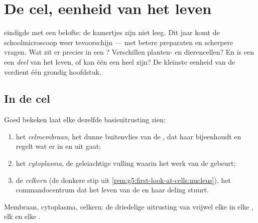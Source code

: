 \chapter{De cel, eenheid van het leven}\label{ch:g6:cell-unit-of-life}

 eindigde met een belofte: de kamertjes
zijn niet leeg. Dit jaar komt de schoolmicroscoop weer tevoorschijn ---
met betere preparaten en scherpere vragen. Wat zit er precies in een ?
Verschillen planten- en dierencellen? En is een  een \emph{deel} van
het leven, of kan één  een heel  zijn? De kleinste eenheid
van de  verdient één grondig hoofdstuk.

\section{In de cel}

\begin{definition}\label{def:g6:cell-unit-of-life:parts}
Goed bekeken laat elke  dezelfde basisuitrusting zien:
\begin{enumerate}
  \item het \emph{celmembraan}, het dunne buitenvlies
        van de , dat haar bijeenhoudt en regelt wat er in en uit gaat;
  \item het \emph{cytoplasma}, de geleiachtige vulling
        waarin het werk van de  gebeurt;
  \item de \emph{celkern} (de donkere stip uit
        \cref{rem:g5:first-look-at-cells:nucleus}), het commandocentrum
        dat het leven van de  en haar deling stuurt.
\end{enumerate}
Membraan, cytoplasma, celkern: de driedelige uitrusting van vrijwel elke
 in elke , elk  en elke .
\end{definition}

